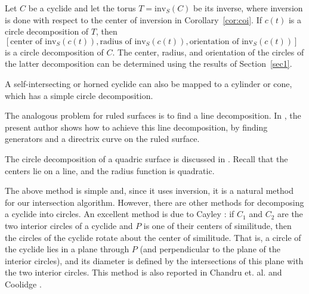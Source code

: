 \begin{lemma}
Let $C$ be a cyclide and let the torus $T = \mbox{inv}_S(C)$ be its inverse,
where inversion is done with respect
to the center of inversion in Corollary~\ref{cor:coi}.
If $c(t)$ is a circle decomposition of $T$,
then $[\mbox{center of inv}_S(c(t)),\mbox{radius of inv}_S(c(t)),
\mbox{orientation of inv}_S(c(t))]$ is a circle decomposition of $C$.
The center, radius, and orientation of the circles of the latter decomposition
can be determined using the results of Section~\ref{sec1}.
\end{lemma}

\begin{rmk}
A self-intersecting or horned cyclide can also be mapped to a cylinder or
cone, which has a simple circle decomposition.
\end{rmk}

\begin{rmk}
The analogous problem for ruled surfaces is to find a line decomposition.
In \cite{jj91ru}, the present author shows how to achieve this line 
decomposition, by finding generators and a directrix curve on the 
ruled surface.
\end{rmk}

\begin{rmk}
The circle decomposition of a quadric surface is discussed in \cite{JS90u}.
Recall that the centers lie on a line, and the radius function is quadratic.
\end{rmk}


The above method is simple and, since it uses inversion, 
it is a natural method for our intersection algorithm.
However, there are other methods for decomposing a cyclide into circles.
%
An excellent method is due to Cayley \cite{CAY96}:
if $C_1$ and $C_2$ are the two interior circles of a cyclide
and $P$ is one of their centers of similitude,
then the circles of the cyclide rotate about the center of similitude.
That is, a circle of the cyclide lies in a plane through $P$ (and
perpendicular to the plane of the interior circles),
and its diameter is defined by the intersections of this plane
with the two interior circles.
This method is also reported in Chandru et. al. \cite[p. 282]{CDH89a}
and Coolidge \cite[p. 270]{Coo71}.

